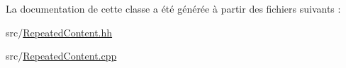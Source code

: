 La documentation de cette classe a été générée à partir des fichiers suivants :\begin{DoxyCompactItemize}
\item 
src/\hyperlink{_repeated_content_8hh}{RepeatedContent.hh}\item 
src/\hyperlink{_repeated_content_8cpp}{RepeatedContent.cpp}\end{DoxyCompactItemize}
